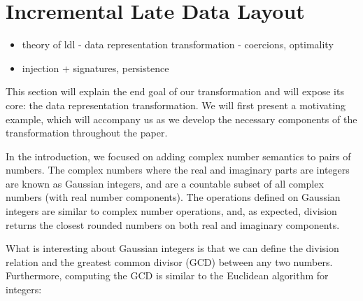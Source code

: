 \section{Incremental Late Data Layout}
\label{sec:ildl}
\begin{itemize}
  \item theory of ldl - data representation transformation - coercions, optimality
  \item injection + signatures, persistence
\end{itemize}

This section will explain the end goal of our transformation and will expose its core: the data representation transformation. We will first present a motivating example, which will accompany us as we develop the necessary components of the transformation throughout the paper.

In the introduction, we focused on adding complex number semantics to pairs of numbers. The complex numbers where the real and imaginary parts are integers are known as Gaussian integers, and are a countable subset of all complex numbers (with real number components). The operations defined on Gaussian integers are similar to complex number operations, and, as expected, division returns the closest rounded numbers on both real and imaginary components.


What is interesting about Gaussian integers is that we can define the division relation and the greatest common divisor (GCD) between any two numbers. Furthermore, computing the GCD is similar to the Euclidean algorithm for integers:

